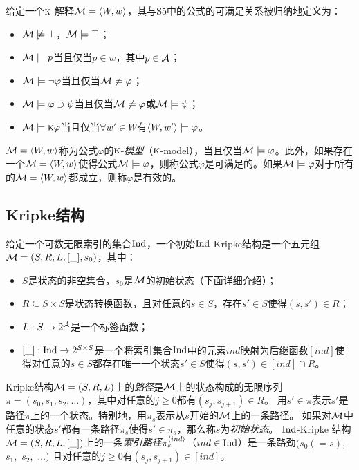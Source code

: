 \begin{definition}\label{def:s5:interp}
	给定一个$\textsc{k}$-解释${\cal M}={\langle{W,w}\rangle}$，其与S5中的公式的可满足关系被归纳地定义为：
	\begin{itemize}
		\item ${\cal M} \not \models \bot$，${\cal M} \models \top$；
		\item ${\cal M} \models p$当且仅当$p\in w$，其中$p\in {\cal A}$；
		\item ${\cal M} \models \neg \varphi$当且仅当${\cal M} \not \models \varphi$；
		\item ${\cal M} \models \varphi \supset \psi$当且仅当${\cal M} \not \models \varphi$或${\cal M} \models \psi$；
		\item ${\cal M} \models \textsc{k} \varphi$当且仅当$\forall w'\in W$有${\langle{W, w'}\rangle}\models \varphi$。
	\end{itemize}
\end{definition}

${\cal M}={\langle{W,w}\rangle}$称为公式$\varphi$的$\textsc{k}$-\emph{模型}（$\textsc{k}$-model），当且仅当${\cal M} \models \varphi$。此外，如果存在一个${\cal M}={\langle{W,w}\rangle}$使得公式${\cal M}\models \varphi$，则称公式$\varphi$是可满足的。如果${\cal M}\models \varphi$对于所有的${\cal M}={\langle{W,w}\rangle}$都成立，则称$\varphi$是有效的。


\subsection{Kripke结构}
给定一个可数无限索引的集合$\textrm{Ind}$，一个初始$\textrm{Ind}$-Kripke结构是一个五元组${\cal M}=(S,R,L,[\_],s_0)$，其中：
\begin{itemize}
	\item $S$是状态的非空集合，$s_0$是${\cal M}$的初始状态（下面详细介绍）；
	\item $R \subseteq S \times S$是状态转换函数，且对任意的$s\in S$，存在$s'\in S$使得$(s,s') \in R$；
	\item $L:S\rightarrow 2^{{\cal A}}$是一个标签函数；
	\item $[\_]: \textrm{Ind} \rightarrow 2^{S \times S}$是一个将索引集合$\textrm{Ind}$中的元素$ind$映射为后继函数$[ind]$使得对任意的$s\in S$都存在唯一一个状态$s'\in S$使得$(s,s')\in [ind] \cap R$。
\end{itemize}

Kripke结构${\cal M}=(S,R,L)$上的{\em 路径}是${\cal M}$上的状态构成的无限序列$\pi=(s_0, s_{1}, s_{2},\dots)$，其中对任意的$j\ge 0$都有$(s_j, s_{j+1}) \in R$。
用$s'\in \pi$表示$s'$是路径$\pi$上的一个状态。特别地，用$\pi_{s}$表示从$s$开始的${\cal M}$上的一条路径。
如果对${\cal M}$中任意的状态$s'$都有一条路径$\pi_s$使得$s'\in \pi_s$，那么称$s$为\emph{初始状态}。
$\textrm{Ind}$-Kripke 结构 ${\cal M}=(S,R,L, [\_])$上的一条\emph{索引路径}$\pi_{s}^{{\langle{ind}\rangle}}$（$ind \in \textrm{Ind}$）是一条路劲$(s_0(=s),$ $s_{1},$ $s_{2},$ $\dots)$ 且对任意的$j \geq 0$有$(s_j, s_{j+1}) \in [ind]$。

